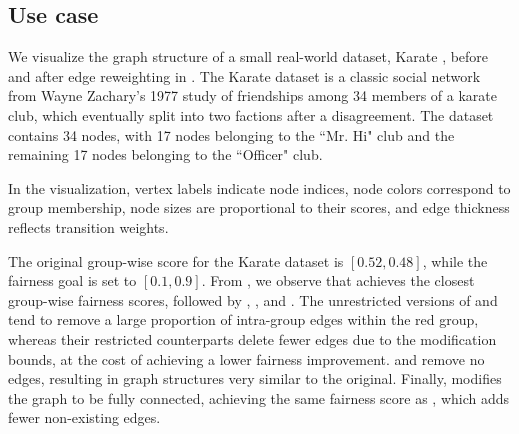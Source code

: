 \documentclass[sigconf, anonymous, review]{acmart}
\begin{document}
\subsection{Use case}

We visualize the graph structure of a small real-world dataset, Karate \citep{zachary1977information, nr}, before and after edge reweighting in . The Karate dataset is a classic social network from Wayne Zachary’s 1977 study of friendships among 34 members of a karate club, which eventually split into two factions after a disagreement. The dataset contains 34 nodes, with 17 nodes belonging to the ``Mr. Hi" club and the remaining 17 nodes belonging to the ``Officer" club.

In the visualization, vertex labels indicate node indices, node colors correspond to group membership, node sizes are proportional to their \pagerank scores, and edge thickness reflects transition weights.

The original group-wise \pagerank score for the Karate dataset is $[0.52, 0.48]$, while the fairness goal is set to $[0.1, 0.9]$. From , we observe that \fairgd achieves the closest group-wise fairness scores, followed by \crossgd, \lfpru, and \lfprn. The unrestricted versions of \fairgd and \crossgd tend to remove a large proportion of intra-group edges within the red group, whereas their restricted counterparts delete fewer edges due to the modification bounds, at the cost of achieving a lower fairness improvement. \fairwalk and \crosswalk remove no edges, resulting in graph structures very similar to the original. Finally, \lfpru modifies the graph to be fully connected, achieving the same fairness score as \lfprn, which adds fewer non-existing edges.
\end{document}
